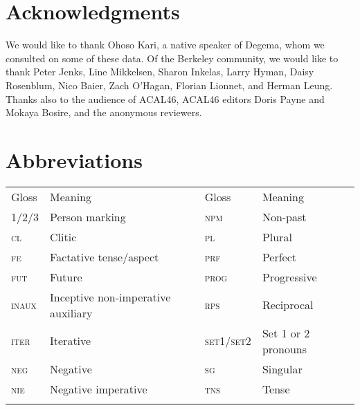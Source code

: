 \documentclass[output=paper]{langsci/langscibook}
\begin{document}
\section*{Acknowledgments}


We would like to thank Ohoso Kari, a native speaker of Degema, whom we consulted on some of these data. Of the Berkeley community, we would like to thank Peter Jenks, Line Mikkelsen, Sharon Inkelas, Larry Hyman, Daisy Rosenblum, Nico Baier, Zach O’Hagan, Florian Lionnet, and Herman Leung. Thanks also to the audience of ACAL46, ACAL46 editors Doris Payne and Mokaya Bosire, and the anonymous reviewers.


\section*{Abbreviations}

\begin{tabularx}{\textwidth}{XXXX}
\lsptoprule

{Gloss} & {Meaning} & {Gloss} & {Meaning}\\
{\scshape 1/2/3} & {Person marking} & {\scshape npm} & {Non-past} \\
{\scshape cl} & {Clitic} & {\scshape pl} & {Plural} \\
{\scshape fe} & {Factative tense/aspect} & {\scshape prf} & {Perfect} \\
{\scshape fut} & {Future} & {\scshape prog} & {Progressive}\\
{\scshape inaux} & {Inceptive non-imperative auxiliary} & {\scshape rps} & {Reciprocal} \\
{\scshape iter} & {Iterative} & {\scshape set1/set2} & {Set 1 or 2 pronouns}\\
{\scshape neg} & {Negative} & {\scshape sg} & {Singular} \\
{\scshape nie} & {Negative imperative} & {\scshape tns} & {Tense} \\
\lspbottomrule
\end{tabularx}
 
 
\printbibliography[heading=subbibliography,notkeyword=this]
\end{document}
